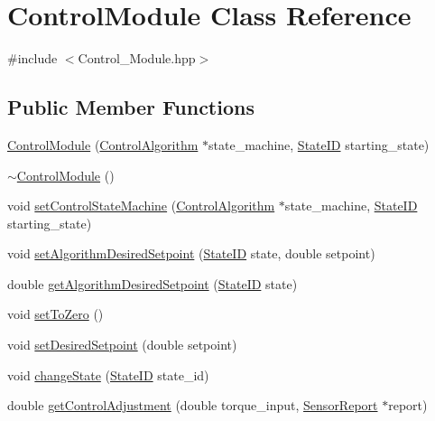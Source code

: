 \hypertarget{classControlModule}{}\section{Control\+Module Class Reference}
\label{classControlModule}


{\ttfamily \#include $<$Control\+\_\+\+Module.\+hpp$>$}

\subsection*{Public Member Functions}
\begin{DoxyCompactItemize}
\item 
\hyperlink{classControlModule_a4314676da13e7c4f658d042bb8035f38}{Control\+Module} (\hyperlink{classControlAlgorithm}{Control\+Algorithm} $\ast$state\+\_\+machine, \hyperlink{States_8hpp_a26aafbeccd8f356b39e1809f1ab9cfdc}{State\+ID} starting\+\_\+state)
\item 
\hyperlink{classControlModule_ade41c6a3ce7c8e4df978c611bc0d9fa8}{$\sim$\+Control\+Module} ()
\item 
void \hyperlink{classControlModule_aaefdbef057adda0ee6ac86225b974736}{set\+Control\+State\+Machine} (\hyperlink{classControlAlgorithm}{Control\+Algorithm} $\ast$state\+\_\+machine, \hyperlink{States_8hpp_a26aafbeccd8f356b39e1809f1ab9cfdc}{State\+ID} starting\+\_\+state)
\item 
void \hyperlink{classControlModule_a02cb4c34e322b292577cb31182ea52a4}{set\+Algorithm\+Desired\+Setpoint} (\hyperlink{States_8hpp_a26aafbeccd8f356b39e1809f1ab9cfdc}{State\+ID} state, double setpoint)
\item 
double \hyperlink{classControlModule_a39e3f7c7bf68975a66ebde771be0fe1e}{get\+Algorithm\+Desired\+Setpoint} (\hyperlink{States_8hpp_a26aafbeccd8f356b39e1809f1ab9cfdc}{State\+ID} state)
\item 
void \hyperlink{classControlModule_a12080a39a838b7d527d9c0908483cd22}{set\+To\+Zero} ()
\item 
void \hyperlink{classControlModule_abe605807dc1f58e4bdea40e49f6f3b12}{set\+Desired\+Setpoint} (double setpoint)
\item 
void \hyperlink{classControlModule_a6698998f891f6243cfbf9590ee72c3d7}{change\+State} (\hyperlink{States_8hpp_a26aafbeccd8f356b39e1809f1ab9cfdc}{State\+ID} state\+\_\+id)
\item 
double \hyperlink{classControlModule_aa3c64f7fe97d2cc67c761770fd7a134a}{get\+Control\+Adjustment} (double torque\+\_\+input, \hyperlink{classSensorReport}{Sensor\+Report} $\ast$report)

\end{DoxyCompactItemize}
